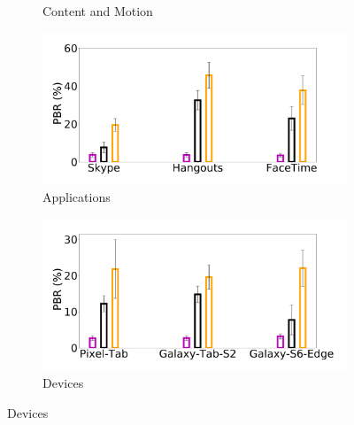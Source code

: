 \begin{figure}
\begin{subfigure}[b]{0.33\textwidth}
        \caption{Content and Motion}
    \end{subfigure}
    \begin{subfigure}[b]{0.33\textwidth}
        \centering
        \includegraphics[width=1\linewidth]{sections/network-work/app-bitrate}
        \caption{Applications}
    \end{subfigure}%
    \begin{subfigure}[b]{0.33\textwidth}
        \centering
        \includegraphics[width=1\linewidth]{sections/network-work/dev-bitrate}
        \caption{Devices}
    \end{subfigure}


\end{figure}
